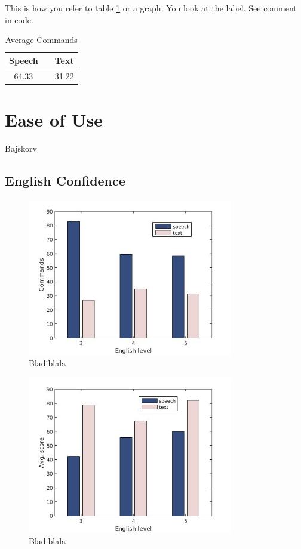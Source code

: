 This is how you refer to table \ref{avg_cmd} or a graph. You look at the label. See comment in code.

\begin{table}[h!]
  \centering
  \begin{tabular}{ccc}
    \toprule
    Speech &   & Text\\
    \midrule
    64.33 &   & 31.22\\
    \bottomrule
  \end{tabular}
  \caption{Average Commands}\label{avg_cmd} %
\end{table}

\section{Ease of Use}
Bajskorv

\subsection{English Confidence}

\begin{figure}[p]
  \centering
  \includegraphics[width=0.8\textwidth]{images/english_cmd.jpg}
  \caption{Bladiblala}\label{eng_cmd}
\end{figure}

\begin{figure}[p]
  \centering
  \includegraphics[width=0.8\textwidth]{images/english_score.jpg}
  \caption{Bladiblala}\label{eng_score}
\end{figure}

